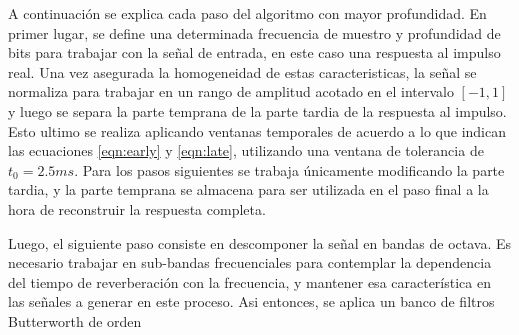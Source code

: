 A continuación se explica cada paso del algoritmo con mayor profundidad.
En primer lugar, se define una determinada frecuencia de muestro y profundidad de bits para trabajar con la señal de entrada, en este caso una respuesta al impulso real. Una vez asegurada la homogeneidad de estas caracteristicas, la señal se normaliza para trabajar en un rango de amplitud acotado en el intervalo $[-1,1]$ y luego se separa la parte temprana de la parte tardia de la respuesta al impulso. Esto ultimo se realiza aplicando ventanas temporales de acuerdo a lo que indican las ecuaciones \ref{eqn:early} y \ref{eqn:late}, utilizando una ventana de tolerancia de $t_{0} = 2.5 ms$. Para los pasos siguientes se trabaja únicamente modificando la parte tardia, y la parte temprana se almacena para ser utilizada en el paso final a la hora de reconstruir la respuesta completa. 

Luego, el siguiente paso consiste en descomponer la señal en bandas de octava. Es necesario trabajar en sub-bandas frecuenciales para contemplar la dependencia del tiempo de reverberación con la frecuencia, y mantener esa característica en las señales a generar en este proceso. Asi entonces, se aplica un banco de filtros Butterworth de orden 


